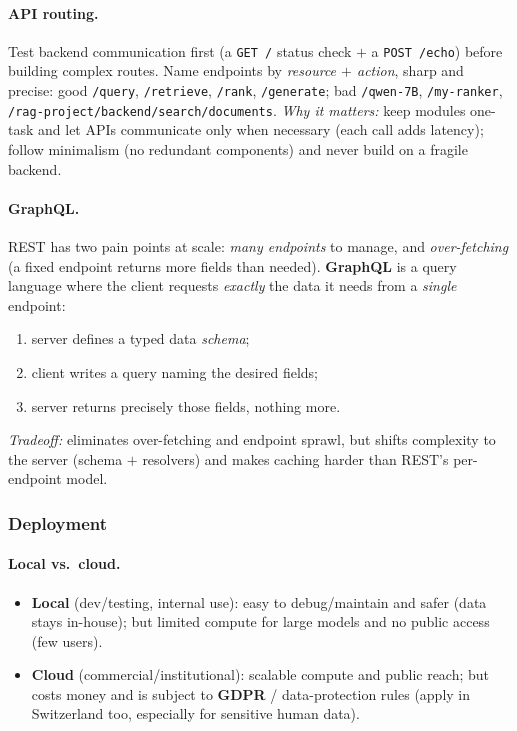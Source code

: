 \documentclass{article}
\begin{document}
\paragraph{API routing.} Test backend communication first (a \texttt{GET /} status check $+$ a \texttt{POST /echo}) before building complex routes. Name endpoints by \textit{resource $+$ action}, sharp and precise: good \texttt{/query}, \texttt{/retrieve}, \texttt{/rank}, \texttt{/generate}; bad \texttt{/qwen-7B}, \texttt{/my-ranker}, \texttt{/rag-project/backend/search/documents}. \textit{Why it matters:} keep modules one-task and let APIs communicate only when necessary (each call adds latency); follow minimalism (no redundant components) and never build on a fragile backend.

\paragraph{GraphQL.} REST has two pain points at scale: \textit{many endpoints} to manage, and \textit{over-fetching} (a fixed endpoint returns more fields than needed). \textbf{GraphQL} is a query language where the client requests \textit{exactly} the data it needs from a \textit{single} endpoint:
\begin{enumerate}
    \item server defines a typed data \textit{schema};
    \item client writes a query naming the desired fields;
    \item server returns precisely those fields, nothing more.
\end{enumerate}
\textit{Tradeoff:} eliminates over-fetching and endpoint sprawl, but shifts complexity to the server (schema $+$ resolvers) and makes caching harder than REST's per-endpoint model.

\subsubsection{Deployment}
\paragraph{Local vs.\ cloud.}
\begin{itemize}
    \item \textbf{Local} (dev/testing, internal use): easy to debug/maintain and safer (data stays in-house); but limited compute for large models and no public access (few users).
    \item \textbf{Cloud} (commercial/institutional): scalable compute and public reach; but costs money and is subject to \textbf{GDPR} / data-protection rules (apply in Switzerland too, especially for sensitive human data).
\end{itemize}
\end{document}
